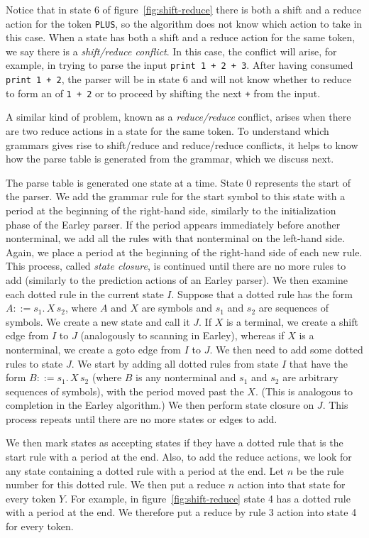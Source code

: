 \documentclass[7x10]{TimesAPriori_MIT}%
\numberwithin{theorem}{chapter}
\numberwithin{definition}{chapter}
\numberwithin{equation}{chapter}
\begin{document}
{Notice that in state 6 of figure~\ref{fig:shift-reduce} there is both
a shift and a reduce action for the token \lstinline{PLUS}, so the
algorithm does not know which action to take in this case. When a
state has both a shift and a reduce action for the same token, we say
there is a \emph{shift/reduce conflict}.  In this case, the conflict
will arise, for example, in trying to parse the input
\lstinline{print 1 + 2 + 3}. After having consumed \lstinline{print 1 + 2},
the parser will be in state 6 and will not know whether to
reduce to form an  of \lstinline{1 + 2} or 
to proceed by shifting the next \lstinline{+} from the input.

A similar kind of problem, known as a \emph{reduce/reduce} conflict,
arises when there are two reduce actions in a state for the same
token. To understand which grammars gives rise to shift/reduce and
reduce/reduce conflicts, it helps to know how the parse table is
generated from the grammar, which we discuss next.

The parse table is generated one state at a time. State 0 represents
the start of the parser. We add the grammar rule for the start symbol
to this state with a period at the beginning of the right-hand side,
similarly to the initialization phase of the Earley parser.  If the
period appears immediately before another nonterminal, we add all the
rules with that nonterminal on the left-hand side. Again, we place a
period at the beginning of the right-hand side of each new
rule. This process, called \emph{state closure}, is continued
until there are no more rules to add (similarly to the prediction
actions of an Earley parser). We then examine each dotted rule in the
current state $I$. Suppose that a dotted rule has the form $A ::=
s_1.\,X \,s_2$, where $A$ and $X$ are symbols and $s_1$ and $s_2$
are sequences of symbols. We create a new state and call it $J$.  If $X$
is a terminal, we create a shift edge from $I$ to $J$ (analogously to
scanning in Earley), whereas if $X$ is a nonterminal, we create a
goto edge from $I$ to $J$.  We then need to add some dotted rules to
state $J$. We start by adding all dotted rules from state $I$ that
have the form $B ::= s_1.\,X\,s_2$ (where $B$ is any nonterminal and
$s_1$ and $s_2$ are arbitrary sequences of symbols), with
the period moved past the $X$.  (This is analogous to completion in
the Earley algorithm.)  We then perform state closure on $J$.  This
process repeats until there are no more states or edges to add.

We then mark states as accepting states if they have a dotted rule
that is the start rule with a period at the end.  Also, to add
the reduce actions, we look for any state containing a dotted rule
with a period at the end. Let $n$ be the rule number for this dotted
rule. We then put a reduce $n$ action into that state for every token
$Y$. For example, in figure~\ref{fig:shift-reduce} state 4 has a
dotted rule with a period at the end. We therefore put a reduce by
rule 3 action into state 4 for every
token.

}
\end{document}
